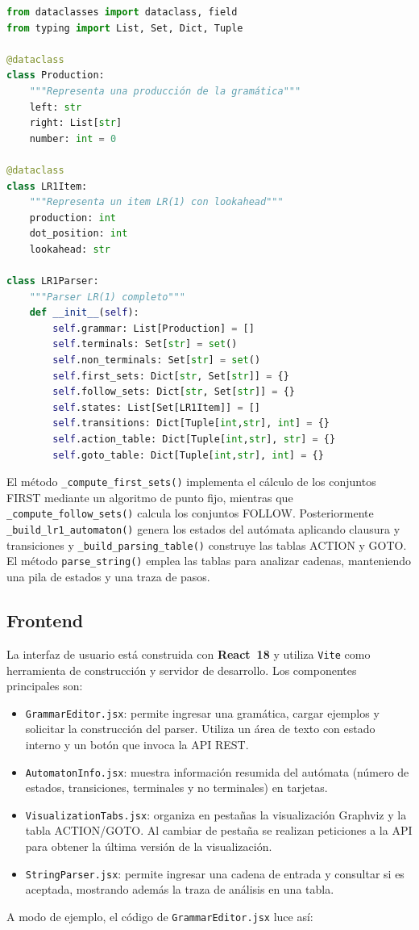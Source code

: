 \documentclass[12pt,a4paper]{article}
\begin{document}
\begin{lstlisting}[style=mypython, language=Python, caption={Definición de clases y atributos principales del parser.}]
from dataclasses import dataclass, field
from typing import List, Set, Dict, Tuple

@dataclass
class Production:
    """Representa una producción de la gramática"""
    left: str
    right: List[str]
    number: int = 0

@dataclass
class LR1Item:
    """Representa un item LR(1) con lookahead"""
    production: int
    dot_position: int
    lookahead: str

class LR1Parser:
    """Parser LR(1) completo"""
    def __init__(self):
        self.grammar: List[Production] = []
        self.terminals: Set[str] = set()
        self.non_terminals: Set[str] = set()
        self.first_sets: Dict[str, Set[str]] = {}
        self.follow_sets: Dict[str, Set[str]] = {}
        self.states: List[Set[LR1Item]] = []
        self.transitions: Dict[Tuple[int,str], int] = {}
        self.action_table: Dict[Tuple[int,str], str] = {}
        self.goto_table: Dict[Tuple[int,str], int] = {}
\end{lstlisting}

El método \texttt{\_compute\_first\_sets()} implementa el cálculo de los conjuntos FIRST mediante un algoritmo de punto fijo, mientras que \texttt{\_compute\_follow\_sets()} calcula los conjuntos FOLLOW.  Posteriormente \texttt{\_build\_lr1\_automaton()} genera los estados del autómata aplicando clausura y transiciones y \texttt{\_build\_parsing\_table()} construye las tablas ACTION y GOTO.  El método \texttt{parse\_string()} emplea las tablas para analizar cadenas, manteniendo una pila de estados y una traza de pasos.

\subsection{Frontend}

La interfaz de usuario está construida con \textbf{React~18} y utiliza \texttt{Vite} como herramienta de construcción y servidor de desarrollo.  Los componentes principales son:
\begin{itemize}
  \item \texttt{GrammarEditor.jsx}: permite ingresar una gramática, cargar ejemplos y solicitar la construcción del parser.  Utiliza un área de texto con estado interno y un botón que invoca la API REST.
  \item \texttt{AutomatonInfo.jsx}: muestra información resumida del autómata (número de estados, transiciones, terminales y no terminales) en tarjetas.
  \item \texttt{VisualizationTabs.jsx}: organiza en pestañas la visualización Graphviz y la tabla ACTION/GOTO.  Al cambiar de pestaña se realizan peticiones a la API para obtener la última versión de la visualización.
  \item \texttt{StringParser.jsx}: permite ingresar una cadena de entrada y consultar si es aceptada, mostrando además la traza de análisis en una tabla.
\end{itemize}
A modo de ejemplo, el código de \texttt{GrammarEditor.jsx} luce así:
\end{document}
